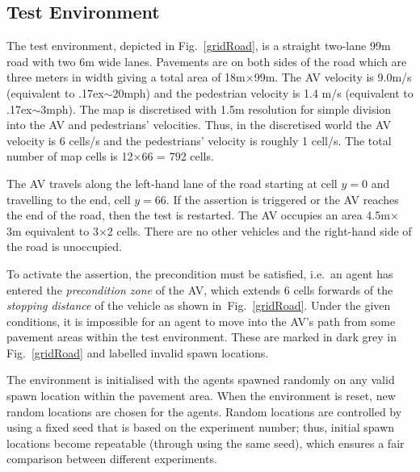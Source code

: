 \documentclass[letterpaper, 10 pt, journal, twoside]{IEEEtran}
\begin{document}
\subsection{Test Environment}
The test environment, depicted in Fig.~\ref{gridRoad}, is a straight two-lane 99m road with two 6m wide lanes. Pavements are on both sides of the road which are three meters in width giving a total area of 18m$\times$99m. 
%
The AV velocity is 9.0m/s (equivalent to {\raise.17ex\hbox{$\scriptstyle\sim$}}20mph) and the pedestrian velocity is 1.4 m/s (equivalent to {\raise.17ex\hbox{$\scriptstyle\sim$}}3mph). The map is discretised with 1.5m resolution for simple division into the AV and pedestrians' velocities. Thus, in the discretised world the AV velocity is 6 cells/s and the pedestrians' velocity is roughly 1 cell/s. The total number of map cells is 12$\times$66 = 792 cells. 

The AV travels along the left-hand lane of the road starting at cell $y=0$ and travelling to the end, cell $y=66$. If the assertion is triggered
 or the AV reaches the end of the road, then the test is restarted. The AV occupies an area 4.5m$\times$3m equivalent to 3$\times$2 cells. There are no other vehicles and the right-hand side of the road is unoccupied.

To activate the assertion, the precondition must be satisfied, i.e.\ an agent has entered the \textit{precondition zone} of the AV, which extends 6 cells forwards of the \textit{stopping distance} of the vehicle as shown in~Fig.~\ref{gridRoad}. 
%
Under the given conditions, it is impossible for an agent to move into the AV's path from some pavement areas within the test environment. These are marked in dark grey in Fig.~\ref{gridRoad} and labelled invalid spawn locations. 

The environment is initialised with the agents spawned randomly on any valid spawn location within the pavement area. When the environment is reset, new random locations are chosen for the agents. Random locations are controlled by using a fixed seed that is based on the experiment number; thus, initial spawn locations become repeatable (through using the same seed), which ensures a fair comparison between different experiments.

\end{document}

